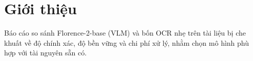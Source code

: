 \section{Giới thiệu}
Báo cáo so sánh Florence-2-base (VLM) và bốn OCR nhẹ trên tài liệu bị che khuất
về độ chính xác, độ bền vững và chi phí xử lý, nhằm chọn mô hình phù hợp với
tài nguyên sẵn có.
